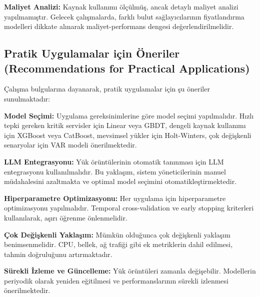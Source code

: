 \textbf{Maliyet Analizi:} Kaynak kullanımı ölçülmüş, ancak detaylı maliyet analizi yapılmamıştır. Gelecek çalışmalarda, farklı bulut sağlayıcılarının fiyatlandırma modelleri dikkate alınarak maliyet-performans dengesi değerlendirilmelidir.

\subsection{Pratik Uygulamalar için Öneriler (Recommendations for Practical Applications)}

Çalışma bulgularına dayanarak, pratik uygulamalar için şu öneriler sunulmaktadır:

\textbf{Model Seçimi:} Uygulama gereksinimlerine göre model seçimi yapılmalıdır. Hızlı tepki gereken kritik servisler için Linear veya GBDT, dengeli kaynak kullanımı için XGBoost veya CatBoost, mevsimsel yükler için Holt-Winters, çok değişkenli senaryolar için VAR modeli önerilmektedir.

\textbf{LLM Entegrasyonu:} Yük örüntülerinin otomatik tanınması için LLM entegrasyonu kullanılmalıdır. Bu yaklaşım, sistem yöneticilerinin manuel müdahalesini azaltmakta ve optimal model seçimini otomatikleştirmektedir.

\textbf{Hiperparametre Optimizasyonu:} Her uygulama için hiperparametre optimizasyonu yapılmalıdır. Temporal cross-validation ve early stopping kriterleri kullanılarak, aşırı öğrenme önlenmelidir.

\textbf{Çok Değişkenli Yaklaşım:} Mümkün olduğunca çok değişkenli yaklaşım benimsenmelidir. CPU, bellek, ağ trafiği gibi ek metriklerin dahil edilmesi, tahmin doğruluğunu artırmaktadır.

\textbf{Sürekli İzleme ve Güncelleme:} Yük örüntüleri zamanla değişebilir. Modellerin periyodik olarak yeniden eğitilmesi ve performanslarının sürekli izlenmesi önerilmektedir.
